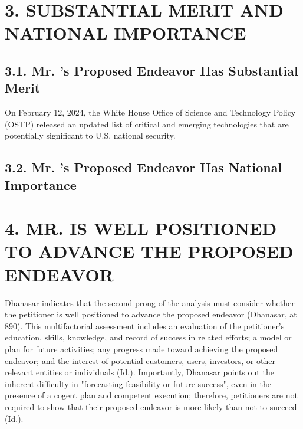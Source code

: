 \section{\texorpdfstring{3. SUBSTANTIAL MERIT AND NATIONAL IMPORTANCE}{3. SUBSTANTIAL MERIT AND NATIONAL IMPORTANCE}}\label{substantial-merit-and-national-importance}

\subsection{\texorpdfstring{3.1. Mr. \myname's Proposed Endeavor Has Substantial Merit}{3.1. Mr. \myname's Proposed Endeavor Has Substantial Merit}}\label{mr.-xxx-proposed-endeavor-has-substantial-merit}

On February 12, 2024, the White House Office of Science and Technology Policy (OSTP) released an updated list of critical and emerging technologies that are potentially significant to U.S. national security. 

\subsection{\texorpdfstring{3.2. Mr. \myname's Proposed Endeavor Has National Importance}{3.2. Mr. \myname's Proposed Endeavor Has National Importance}}\label{mr.-xxx-proposed-endeavor-has-national-importance}

\section{\texorpdfstring{4. MR. \myname IS WELL POSITIONED TO ADVANCE THE PROPOSED ENDEAVOR}{4. MR. \myname IS WELL POSITIONED TO ADVANCE THE PROPOSED ENDEAVOR }}\label{mr.-xxx-is-well-positioned-to-advance-the-proposed-endeavor}

Dhanasar indicates that the second prong of the analysis must consider whether the petitioner is well positioned to advance the proposed endeavor (Dhanasar, at 890). This multifactorial assessment includes an evaluation of the petitioner's education, skills, knowledge, and record of success in related efforts; a model or plan for future activities; any progress made toward achieving the proposed endeavor; and the interest of potential customers, users, investors, or other relevant entities or individuals (Id.). Importantly, Dhanasar points out the inherent difficulty in "forecasting feasibility or future success", even in the presence of a cogent plan and competent execution;
therefore, petitioners are not required to show that their proposed endeavor is more likely than not to succeed (Id.). 

